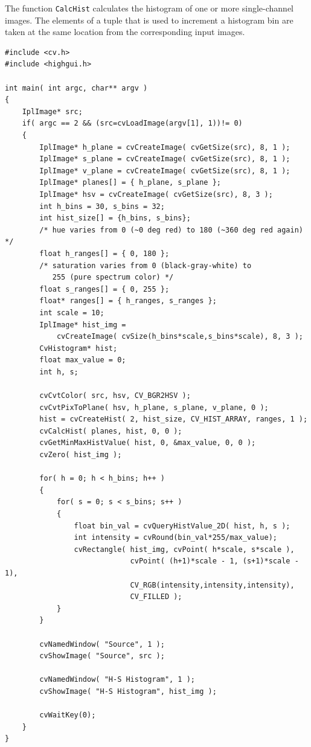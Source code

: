 \begin{description}
\end{description}

The function \texttt{CalcHist} calculates the histogram of one or more
single-channel images. The elements of a tuple that is used to increment
a histogram bin are taken at the same location from the corresponding
input images.

\begin{lstlisting}
#include <cv.h>
#include <highgui.h>

int main( int argc, char** argv )
{
    IplImage* src;
    if( argc == 2 && (src=cvLoadImage(argv[1], 1))!= 0)
    {
        IplImage* h_plane = cvCreateImage( cvGetSize(src), 8, 1 );
        IplImage* s_plane = cvCreateImage( cvGetSize(src), 8, 1 );
        IplImage* v_plane = cvCreateImage( cvGetSize(src), 8, 1 );
        IplImage* planes[] = { h_plane, s_plane };
        IplImage* hsv = cvCreateImage( cvGetSize(src), 8, 3 );
        int h_bins = 30, s_bins = 32;
        int hist_size[] = {h_bins, s_bins};
        /* hue varies from 0 (~0 deg red) to 180 (~360 deg red again) */
        float h_ranges[] = { 0, 180 };
        /* saturation varies from 0 (black-gray-white) to
           255 (pure spectrum color) */
        float s_ranges[] = { 0, 255 };
        float* ranges[] = { h_ranges, s_ranges };
        int scale = 10;
        IplImage* hist_img =
            cvCreateImage( cvSize(h_bins*scale,s_bins*scale), 8, 3 );
        CvHistogram* hist;
        float max_value = 0;
        int h, s;

        cvCvtColor( src, hsv, CV_BGR2HSV );
        cvCvtPixToPlane( hsv, h_plane, s_plane, v_plane, 0 );
        hist = cvCreateHist( 2, hist_size, CV_HIST_ARRAY, ranges, 1 );
        cvCalcHist( planes, hist, 0, 0 );
        cvGetMinMaxHistValue( hist, 0, &max_value, 0, 0 );
        cvZero( hist_img );

        for( h = 0; h < h_bins; h++ )
        {
            for( s = 0; s < s_bins; s++ )
            {
                float bin_val = cvQueryHistValue_2D( hist, h, s );
                int intensity = cvRound(bin_val*255/max_value);
                cvRectangle( hist_img, cvPoint( h*scale, s*scale ),
                             cvPoint( (h+1)*scale - 1, (s+1)*scale - 1),
                             CV_RGB(intensity,intensity,intensity),
                             CV_FILLED );
            }
        }

        cvNamedWindow( "Source", 1 );
        cvShowImage( "Source", src );

        cvNamedWindow( "H-S Histogram", 1 );
        cvShowImage( "H-S Histogram", hist_img );

        cvWaitKey(0);
    }
}
\end{lstlisting}

